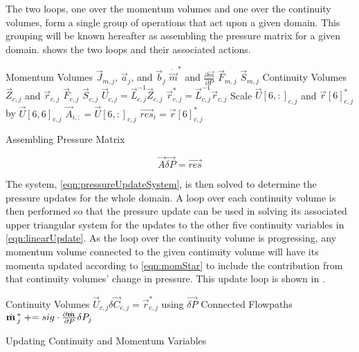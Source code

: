 The two loops, one over the momentum volumes and one over the continuity volumes, form a single group of operations that act upon a given domain.
This grouping will be known hereafter as assembling the pressure matrix for a given domain.
 shows the two loops and their associated actions.

\begin{algo}[ht!]
\setlength{\baselineskip}{0.625\baselineskip}
\begin{algorithmic}[1]
\Loop \; Momentum Volumes
	\Calculate $\vec{J}_{m, j}$, $\vec{a}_{j}$, and $\vec{b}_{j}$
	\Calculate $\dot{\vec{m}}^{*}$ and $\frac{\partial \dot{\vec{m}}}{\partial P}$
	\Calculate $\vec{F}_{m, j}$	
	\Calculate $\vec{S}_{m, j}$	
\EndLoop
\Loop \; Continuity Volumes
   	\Calculate $\vec{Z}_{c,j}$ and $\vec{r}_{c, j}$
 	\Calculate $\vec{F}_{c, j}$	
	\Calculate $\vec{S}_{c, j}$	
   	\Calculate $\vec{U}_{c, j} = \vec{L}_{c, j}^{-1} \vec{Z}_{c, j}$
   	\Calculate $\vec{r}^{*}_{c, j} = \vec{L}_{c, j}^{-1} \vec{r}_{c, j}$
   	\Set Scale $\vec{U}[6, :]_{c, j}$ and $\vec{r}[6]^{*}_{c, j}$ by $\vec{U}[6,6]_{c, j}$
   	\Set $\vec{A}_{i, :} = \vec{U}[6,:]_{c, j}$
   	\Set $\vec{res}_{i} = \vec{r}[6]^{*}_{c, j}$
\EndLoop
\end{algorithmic}
\caption{Assembling Pressure Matrix}
\label{alg:xschem}
\end{algo}

\begin{equation}
\label{eqn:pressureUpdateSystem}
\vec{A} \vec{\delta P} = \vec{res}
\end{equation}

The system, \eqref{eqn:pressureUpdateSystem}, is then solved to determine the pressure updates for the whole domain.
A loop over each continuity volume is then performed so that the pressure update can be used in solving its associated upper triangular system for the updates to the other five continuity variables in \eqref{eqn:linearUpdate}.
As the loop over the continuity volume is progressing, any momentum volume connected to the given continuity volume will have its momenta updated according to \eqref{eqn:momStar} to include the contribution from that continuity volumes' change in pressure. 
This update loop is shown in .

\begin{algo}[ht!]
\setlength{\baselineskip}{0.625\baselineskip}
\begin{algorithmic}[1]
\Loop \; Continuity Volumes
	\Solve $\vec{U}_{c, j} \delta \vec{C}_{c, j} = \vec{r}^{*}_{c, j}$ using $\vec{\delta P}$		
	\Loop \; Connected Flowpaths
		\Set $\dot{\vec{m}}^{*}_{j} \pluseq sig \cdot \frac{\partial \dot{\vec{m}}}{\partial P} \delta P_{j}$
	\EndLoop
\EndLoop
\end{algorithmic}
\caption{Updating Continuity and Momentum Variables}
\label{alg:updateVariables}
\end{algo}


